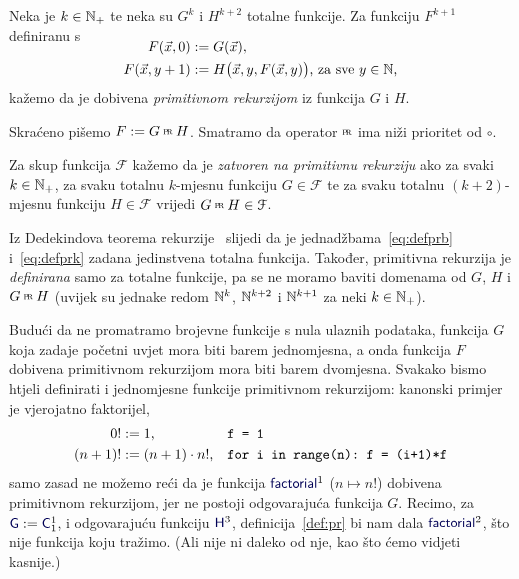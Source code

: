 
\begin{definicija}[{name=[primitivna rekurzija]}]\label{def:pr}
Neka je $k\in{\mathbb N}_+$ te neka su $G^k$ i $H^{k+2}$ totalne funkcije. Za funkciju $F^{k+1}$\\ definiranu s
\begin{align}
\SwapAboveDisplaySkip
\label{eq:defprb}
F(\vec x,0)&:=G(\vec x)\text,\\
\label{eq:defprk}
F(\vec x,y+1)&:=H\bigl(\vec x,y,F(\vec x,y)\bigr)\text{, za sve $y\in\N$,}
\end{align}
kažemo da je dobivena \emph{primitivnom rekurzijom} iz funkcija $G$ i $H$.

	Skraćeno pišemo $F:=G\pr H$. Smatramo da operator $\pr$ ima niži prioritet od $\circ$.

Za skup funkcija $\mathcal F$ kažemo da je \emph{zatvoren na primitivnu rekurziju} ako za svaki $k\in{\mathbb N}_+$, za svaku totalnu $k$-mjesnu funkciju $G\in\mathcal F$ te za svaku totalnu $(k+2)$-mjesnu funkciju $H\in\mathcal F$ vrijedi $G\pr H\in\mathcal F$.
\end{definicija}

\begin{napomena}[{name=[ulazi i izlaz primitivne rekurzije su totalne funkcije]}]\label{nap:prtot}
	Iz Dedekindova teorema rekurzije~\cite{skr:VukTS} slijedi da je jednadžbama~\eqref{eq:defprb} i~\eqref{eq:defprk} zadana jedinstvena totalna funkcija. Također, primitivna rekurzija je \emph{definirana} samo za totalne funkcije, pa se ne moramo baviti domenama od $G$, $H$ i $G\pr H$ (uvijek su jednake redom ${\mathbb N}^k$, ${\mathbb N}^{k+2}$ i ${\mathbb N}^{k+1}$ za neki $k\in{\mathbb N}_+\mspace{-1mu}$).
\end{napomena}

Budući da ne promatramo brojevne funkcije s nula ulaznih podataka, funkcija $G$ koja zadaje početni uvjet mora biti barem jednomjesna, a onda funkcija $F$ dobivena primitivnom rekurzijom mora biti barem dvomjesna. Svakako bismo htjeli definirati i jednomjesne funkcije primitivnom rekurzijom: kanonski primjer je vjerojatno faktorijel,
\begin{align}
\label{eq:faktb}
	0!&:=1\text,&&\texttt{f = 1}\\
\label{eq:faktk}
	(n+1)!&:=(n+1)\cdot n!\text,&&\texttt{for i in range(n):~f = (i+1)*f}
\end{align}
samo zasad ne možemo reći da je funkcija $\f{factorial}^1$ ($n\mapsto n!$) dobivena primitivnom rekurzijom, jer ne postoji odgovarajuća funkcija $G$. Recimo, za $\f G:=\f C_1^1$, i odgovarajuću funkciju $\f H^3$, definicija~\ref{def:pr} bi nam dala $\f{factorial}^2$, što nije funkcija koju tražimo. (Ali nije ni daleko od nje, kao što ćemo vidjeti kasnije.)


